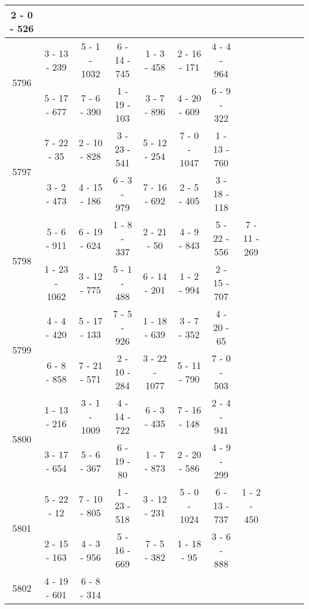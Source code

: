 \begin{longtable}{c | c | c | c | c | c | c | c | c | c | c | c}
2 - 0 - 526
&\space\\\hline
\multirow{2}{*}{5796}
& 3 - 13 - 239
&
5 - 1 - 1032
&
6 - 14 - 745
&
1 - 3 - 458
&
2 - 16 - 171
&
4 - 4 - 964
&\space\\* \space
&
5 - 17 - 677
&
7 - 6 - 390
&
1 - 19 - 103
&
3 - 7 - 896
&
4 - 20 - 609
&
6 - 9 - 322
&\space\\\hline
\multirow{2}{*}{5797}
& 7 - 22 - 35
&
2 - 10 - 828
&
3 - 23 - 541
&
5 - 12 - 254
&
7 - 0 - 1047
&
1 - 13 - 760
&\space\\* \space
&
3 - 2 - 473
&
4 - 15 - 186
&
6 - 3 - 979
&
7 - 16 - 692
&
2 - 5 - 405
&
3 - 18 - 118
&\space\\\hline
\multirow{2}{*}{5798}
& 5 - 6 - 911
&
6 - 19 - 624
&
1 - 8 - 337
&
2 - 21 - 50
&
4 - 9 - 843
&
5 - 22 - 556
&
7 - 11 - 269
\\* \space
&
1 - 23 - 1062
&
3 - 12 - 775
&
5 - 1 - 488
&
6 - 14 - 201
&
1 - 2 - 994
&
2 - 15 - 707
&\space\\\hline
\multirow{2}{*}{5799}
& 4 - 4 - 420
&
5 - 17 - 133
&
7 - 5 - 926
&
1 - 18 - 639
&
3 - 7 - 352
&
4 - 20 - 65
&\space\\* \space
&
6 - 8 - 858
&
7 - 21 - 571
&
2 - 10 - 284
&
3 - 22 - 1077
&
5 - 11 - 790
&
7 - 0 - 503
&\space\\\hline
\multirow{2}{*}{5800}
& 1 - 13 - 216
&
3 - 1 - 1009
&
4 - 14 - 722
&
6 - 3 - 435
&
7 - 16 - 148
&
2 - 4 - 941
&\space\\* \space
&
3 - 17 - 654
&
5 - 6 - 367
&
6 - 19 - 80
&
1 - 7 - 873
&
2 - 20 - 586
&
4 - 9 - 299
&\space\\\hline
\multirow{2}{*}{5801}
& 5 - 22 - 12
&
7 - 10 - 805
&
1 - 23 - 518
&
3 - 12 - 231
&
5 - 0 - 1024
&
6 - 13 - 737
&
1 - 2 - 450
\\* \space
&
2 - 15 - 163
&
4 - 3 - 956
&
5 - 16 - 669
&
7 - 5 - 382
&
1 - 18 - 95
&
3 - 6 - 888
&\space\\\hline
\multirow{2}{*}{5802}
& 4 - 19 - 601
&
6 - 8 - 314

\end{longtable}
